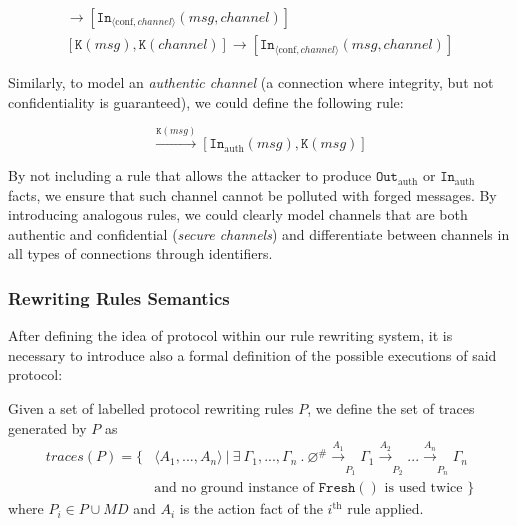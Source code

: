 \begin{gather*}
    [\texttt{Out}_{\langle \textrm{conf}, channel \rangle}(msg, channel)] \to [\texttt{In}_{\langle \textrm{conf}, channel \rangle}(msg, channel)]\\
    [\texttt{K}(msg), \texttt{K}(channel)] \to [\texttt{In}_{\langle \textrm{conf}, channel \rangle}(msg, channel)]
\end{gather*}

Similarly, to model an \textit{authentic channel} (a connection where integrity, but not confidentiality is guaranteed), we could define the following rule:

\begin{equation*}
    [\texttt{Out}_{\textrm{auth}}(msg)] \xrightarrow{\texttt{K}(msg)} [\texttt{In}_{\textrm{auth}}(msg), \texttt{K}(msg)]
\end{equation*}

By not including a rule that allows the attacker to produce $\texttt{Out}_\textrm{auth}$ or $\texttt{In}_\textrm{auth}$ facts, we ensure that such channel cannot be polluted with forged messages. By introducing analogous rules, we could clearly model channels that are both authentic and confidential (\textit{secure channels}) and differentiate between channels in all types of connections through identifiers.

\subsubsection{Rewriting Rules Semantics}
After defining the idea of protocol within our rule rewriting system, it is necessary to introduce also a formal definition of the possible executions of said protocol:

\begin{definition}
    Given a set of labelled protocol rewriting rules $P$, we define the set of traces generated by $P$ as
    \begin{align*}
        traces(P) = \{ &\langle A_1,...,A_n \rangle \ | \ \exists \ \Gamma_1,...,\Gamma_n \ . \ \varnothing ^{\#} \xrightarrow[]{A_1}_{P_1} \Gamma_1 \xrightarrow[]{A_2}_{P_2} ... \xrightarrow[]{A_n}_{P_n} \Gamma_n\\
        & \textrm{and no ground instance of } \texttt{Fresh}() \textrm{ is used twice }\}
    \end{align*}
    where $P_i \in P \cup MD$ and $A_i$ is the action fact of the $i^\textrm{th}$ rule applied.
\end{definition}

